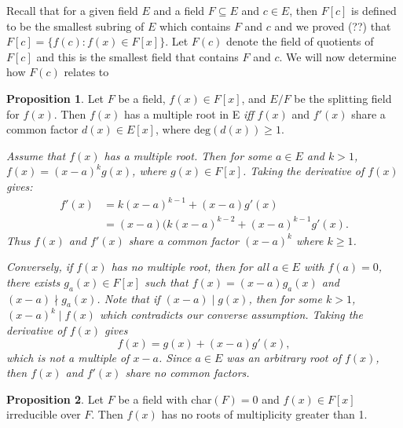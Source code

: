 \documentclass{article}
\makeatletter
\theoremstyle{definition}
\newtheorem{prop}{Proposition}[section]
\theoremstyle{remark}
\let\oldproofname=\proofname
\renewcommand{\proofname}{\bf{\textit{\oldproofname}}}
\theoremstyle{definition}
\renewenvironment{proof*}[1][\proofname]{\par
  \pushQED{\qed}%
  \normalfont \topsep6\p@\@plus6\p@\relax
  \list{}{\leftmargin=0mm
          \rightmargin=0mm
          \settowidth{\itemindent}{\itshape#1}%
          \labelwidth=\itemindent
          \parsep=0pt \listparindent=0mm%
  }
  \item[\hskip\labelsep
        \itshape
    #1\@addpunct{.}]\ignorespaces
}{%
  \popQED\endlist\@endpefalse
}
\makeatother
\begin{document}
    Recall that for a given field $E$ and a field $F\subseteq E$ and $c\in E$, then $F[c]$ is defined to be the smallest subring of $E$ which contains $F$ and $c$ and we proved (??) that $F[c]=\{f(c)\colon f(x)\in F[x]\}$. Let $F(c)$ denote the field of quotients of $F[c]$ and this is the smallest field that contains $F$ and $c$. We will now determine how $F(c)$ relates to
    \newpage
    \begin{prop}\label{prop:2.1}
        Let $F$ be a field, $f(x)\in F[x]$, and $E/F$ be the splitting field for $f(x)$. Then $f(x)$ has a multiple root in E \textit{iff} $f(x)$ and $f'(x)$ share a common factor $d(x)\in E[x]$, where $\text{deg}(d(x))\geq 1$. 
    \end{prop}
        \begin{proof*}
            \emph{Assume that $f(x)$ has a multiple root. Then for some $a\in E$ and $k>1$, $f(x)=(x-a)^kg(x)$, where $g(x)\in F[x]$. Taking the derivative of $f(x)$ gives:
                \begin{equation*}
                    \begin{split}
                        f'(x)&=k(x-a)^{k-1}+(x-a)g'(x) \\
                        &= (x-a)(k(x-a)^{k-2}+(x-a)^{k-1}g'(x).
                    \end{split}
                \end{equation*}
                Thus $f(x)$ and $f'(x)$ share a common factor $(x-a)^k$ where $k\geq 1$.}\par\hspace{4mm}
            \emph{Conversely, if $f(x)$ has no multiple root, then for all $a\in E$ with $f(a)=0$, there exists $g_a(x)\in F[x]$ such that $f(x)=(x-a)g_a(x)$ and $(x-a)\nmid g_a(x)$. Note that if $(x-a)\mid g(x)$, then for some $k>1$, $(x-a)^k\mid f(x)$ which contradicts our converse assumption. Taking the derivative of $f(x)$ gives
                \begin{equation*}
                    f(x)=g(x)+(x-a)g'(x),
                \end{equation*}
            which is not a multiple of $x-a$. Since $a\in E$ was an arbitrary root of $f(x)$, then $f(x)$ and $f'(x)$ share no common factors.
                }
        \end{proof*}
    \begin{prop}
        Let $F$ be a field with char$(F)=0$ and $f(x)\in F[x]$ irreducible over $F$. Then $f(x)$ has no roots of multiplicity greater than 1.
    \end{prop}
\end{document}
